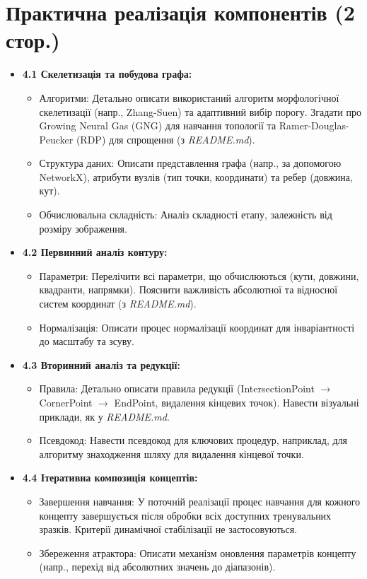 \documentclass[12pt, a4paper]{article}
\begin{document}
\section{Практична реалізація компонентів (2 стор.)}
\begin{itemize}
    \item \textbf{4.1 Скелетизація та побудова графа:}
    \begin{itemize}
        \item Алгоритми: Детально описати використаний алгоритм морфологічної скелетизації (напр., Zhang-Suen) та адаптивний вибір порогу. Згадати про Growing Neural Gas (GNG) для навчання топології та Ramer-Douglas-Peucker (RDP) для спрощення (з \textit{README.md}).
        \item Структура даних: Описати представлення графа (напр., за допомогою NetworkX), атрибути вузлів (тип точки, координати) та ребер (довжина, кут).
        \item Обчислювальна складність: Аналіз складності етапу, залежність від розміру зображення.
    \end{itemize}
    \item \textbf{4.2 Первинний аналіз контуру:}
    \begin{itemize}
        \item Параметри: Перелічити всі параметри, що обчислюються (кути, довжини, квадранти, напрямки). Пояснити важливість абсолютної та відносної систем координат (з \textit{README.md}).
        \item Нормалізація: Описати процес нормалізації координат для інваріантності до масштабу та зсуву.
    \end{itemize}
    \item \textbf{4.3 Вторинний аналіз та редукції:}
    \begin{itemize}
        \item Правила: Детально описати правила редукції (IntersectionPoint $\rightarrow$ CornerPoint $\rightarrow$ EndPoint, видалення кінцевих точок). Навести візуальні приклади, як у \textit{README.md}.
        \item Псевдокод: Навести псевдокод для ключових процедур, наприклад, для алгоритму знаходження шляху для видалення кінцевої точки.
    \end{itemize}
    \item \textbf{4.4 Ітеративна композиція концептів:}
    \begin{itemize}
        \item Завершення навчання: У поточній реалізації процес навчання для кожного концепту завершується після обробки всіх доступних тренувальних зразків. Критерії динамічної стабілізації не застосовуються.
        \item Збереження атрактора: Описати механізм оновлення параметрів концепту (напр., перехід від абсолютних значень до діапазонів).
    \end{itemize}
\end{itemize}
\end{document}
